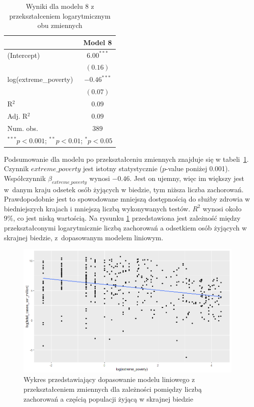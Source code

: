 \documentclass[12pt]{mwbk}
\theoremstyle{plain}
\theoremstyle{definition}
\theoremstyle{definition}
\newcommand\zrodlo[1]{\par\vspace{-3mm}{\small\textit{Źródło: }#1 }}
\begin{document}
\begin{table}[!htbp]
	\begin{center}
		\begin{tabular}{l c}
			\hline
			& Model 8 \\
			\hline
			(Intercept)           & $6.00^{***}$  \\
			& $(0.16)$      \\
			log(extreme\_poverty) & $-0.46^{***}$ \\
			& $(0.07)$      \\
			\hline
			R$^2$                 & $0.09$        \\
			Adj. R$^2$            & $0.09$        \\
			Num. obs.             & $389$         \\
			\hline
			\multicolumn{2}{l}{\scriptsize{$^{***}p<0.001$; $^{**}p<0.01$; $^{*}p<0.05$}}
		\end{tabular}
		\caption{Wyniki dla modelu 8 z przekształceniem logarytmicznym obu zmiennych}
		\label{table:mod9-log}
	\end{center}
\end{table}

Podsumowanie dla modelu po przekształceniu zmiennych znajduje się w tabeli~\ref{table:mod9-log}. Czynnik $extreme\_poverty$ jest istotny statystycznie ($p$-value poniżej 0.001). \\Współczynnik $\beta_{extreme\_poverty}$ wynosi $-0.46$. Jest on ujemny, więc im większy jest w~danym kraju odsetek osób żyjących w biedzie, tym niższa liczba zachorowań. Prawdopodobnie jest to spowodowane mniejszą dostępnością do służby zdrowia w biedniejszych krajach i mniejszą liczbą wykonywanych testów. $R^2$ wynosi około $9\%$, co jest niską wartością. Na rysunku \ref{fig:mod9-log} przedstawiona jest zależność między przekształconymi logarytmicznie liczbą zachorowań a odsetkiem osób żyjących w skrajnej biedzie, z~dopasowanym modelem liniowym. 

\newpage

\begin{figure}[!ht]
	\centering
	\includegraphics[width=\linewidth]{rys/mod9-log.png}
	\caption{Wykres przedstawiający dopasowanie modelu liniowego z przekształceniem zmiennych dla zależności pomiędzy liczbą zachorowań a częścią populacji żyjącą w skrajnej biedzie}
	\label{fig:mod9-log}
	\zrodlo{Opracowanie własne}
\end{figure}
\end{document}
